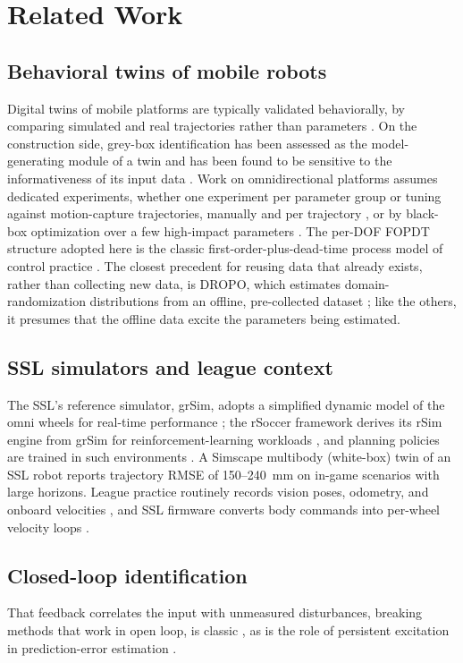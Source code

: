 \section{Related Work}
\label{sec:related}

\subsection{Behavioral twins of mobile robots}


Digital twins of mobile platforms are typically validated behaviorally, by comparing simulated and real trajectories rather than parameters \cite{barioni2024development,yang2025digital}. On the construction side, grey-box identification has been assessed as the model-generating module of a twin and has been found to be sensitive to the informativeness of its input data \cite{brennan2025greybox}. Work on omnidirectional platforms assumes dedicated experiments, whether one experiment per parameter group \cite{giro2023otbot} or tuning against motion-capture trajectories, manually and per trajectory
\cite{wiedemann2024simulation}, or by black-box optimization over a few high-impact parameters \cite{wiedemann2025automated}. The per-DOF FOPDT structure adopted here is the classic first-order-plus-dead-time process model of control practice \cite{astrom1995pid}. The closest precedent for reusing
data that already exists, rather than collecting new data, is DROPO, which estimates domain-randomization distributions from an offline, pre-collected dataset \cite{tiboni2023dropo}; like the others, it presumes that the offline data excite the parameters being estimated.

\subsection{SSL simulators and league context}
The SSL's reference simulator, grSim, adopts a simplified dynamic model of the omni wheels for real-time performance \cite{monajjemi2012grsim}; the rSoccer framework derives its rSim engine from grSim for reinforcement-learning workloads \cite{martins2021rsoccer}, and planning policies are trained in such environments \cite{machado2025planning}. A Simscape multibody (white-box) twin of an SSL robot reports trajectory RMSE of 150--240~mm on in-game scenarios with large horizons\cite{araujo2025digital}. League practice routinely records vision poses, odometry, and onboard velocities \cite{melo2023dataset}, and SSL firmware
converts body commands into per-wheel velocity loops \cite{freiberger2024implementation}.

\subsection{Closed-loop identification}
That feedback correlates the input with unmeasured disturbances, breaking methods that work in open loop, is classic \cite{gustavsson1977identification,vandenhof1998closedloop,forssell1999closedloop}, as is the role of persistent excitation in prediction-error estimation \cite{ljung1999system}.